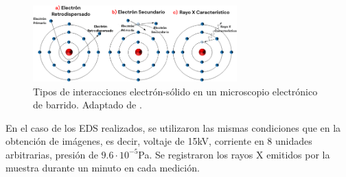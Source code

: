 \documentclass[../main.tex]{subfiles}
\begin{document}
\begin{figure}[H]
    \centering
    \includegraphics[width=0.7\textwidth]{fig/semtipos.png}
    \caption{Tipos de interacciones electrón-sólido en un microscopio electrónico de barrido. Adaptado de \cite{Jensen2022}.}
    \label{semtipos}
\end{figure}
En el caso de los EDS realizados, se utilizaron las mismas condiciones que en la obtención de imágenes, es decir, voltaje de 15kV, corriente en 8 unidades arbitrarias, presión de $9.6\cdot10^{-5}$Pa. Se registraron los rayos X emitidos por la muestra durante un minuto en cada medición.
\end{document}
